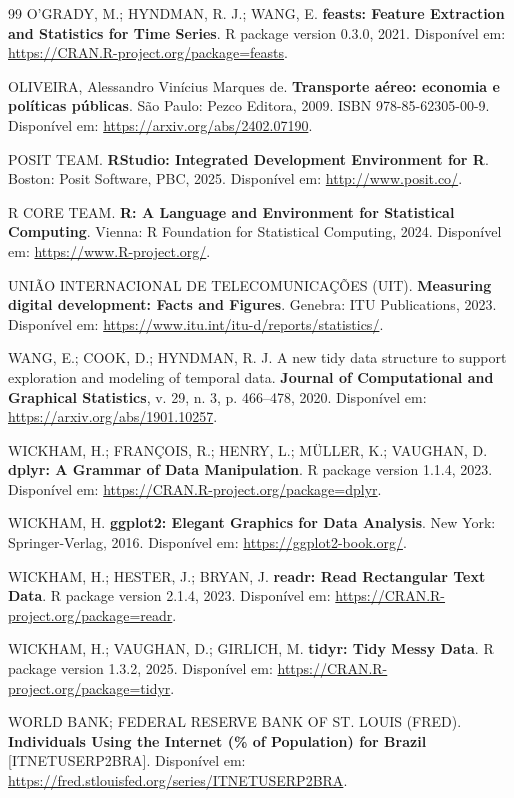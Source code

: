 \documentclass[12pt, a4paper]{article}
\begin{document}
\begin{thebibliography}{99}
O'GRADY, M.; HYNDMAN, R. J.; WANG, E. \textbf{feasts: Feature Extraction and Statistics for Time Series}. R package version 0.3.0, 2021. Disponível em: \url{https://CRAN.R-project.org/package=feasts}.

OLIVEIRA, Alessandro Vinícius Marques de. \textbf{Transporte aéreo: economia e políticas públicas}. São Paulo: Pezco Editora, 2009. ISBN 978-85-62305-00-9. Disponível em: \url{https://arxiv.org/abs/2402.07190}.

POSIT TEAM. \textbf{RStudio: Integrated Development Environment for R}. Boston: Posit Software, PBC, 2025. Disponível em: \url{http://www.posit.co/}.

R CORE TEAM. \textbf{R: A Language and Environment for Statistical Computing}. Vienna: R Foundation for Statistical Computing, 2024. Disponível em: \url{https://www.R-project.org/}.

UNIÃO INTERNACIONAL DE TELECOMUNICAÇÕES (UIT). \textbf{Measuring digital development: Facts and Figures}. Genebra: ITU Publications, 2023. Disponível em: \url{https://www.itu.int/itu-d/reports/statistics/}.

WANG, E.; COOK, D.; HYNDMAN, R. J. A new tidy data structure to support exploration and modeling of temporal data. \textbf{Journal of Computational and Graphical Statistics}, v. 29, n. 3, p. 466--478, 2020. Disponível em: \url{https://arxiv.org/abs/1901.10257}.

WICKHAM, H.; FRANÇOIS, R.; HENRY, L.; MÜLLER, K.; VAUGHAN, D. \textbf{dplyr: A Grammar of Data Manipulation}. R package version 1.1.4, 2023. Disponível em: \url{https://CRAN.R-project.org/package=dplyr}.

WICKHAM, H. \textbf{ggplot2: Elegant Graphics for Data Analysis}. New York: Springer-Verlag, 2016. Disponível em: \url{https://ggplot2-book.org/}.

WICKHAM, H.; HESTER, J.; BRYAN, J. \textbf{readr: Read Rectangular Text Data}. R package version 2.1.4, 2023. Disponível em: \url{https://CRAN.R-project.org/package=readr}.

WICKHAM, H.; VAUGHAN, D.; GIRLICH, M. \textbf{tidyr: Tidy Messy Data}. R package version 1.3.2, 2025. Disponível em: \url{https://CRAN.R-project.org/package=tidyr}.

WORLD BANK; FEDERAL RESERVE BANK OF ST. LOUIS (FRED). \textbf{Individuals Using the Internet (\% of Population) for Brazil} [ITNETUSERP2BRA]. Disponível em: \url{https://fred.stlouisfed.org/series/ITNETUSERP2BRA}.

\end{thebibliography}
\end{document}
